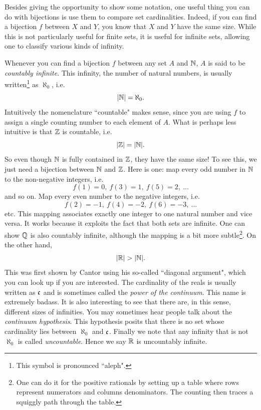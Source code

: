 Besides giving the opportunity to show some notation, one useful thing you can
do with bijections is use them to compare set cardinalities. Indeed, if you can
find a bijection $f$ between $X$ and $Y$, you know that $X$ and $Y$ have the
same size. While this is not particularly useful for finite sets, it is useful
for infinite sets, allowing one to classify various kinds of infinity.

\begin{example*}{}{}
Whenever you can find a bijection $f$ between any set $A$ and $\mathbb{N}$, $A$ is said to
be {\it countably infinite}. This infinity, the number
of natural numbers, is usually written\footnote{This symbol is pronounced
``aleph".} as $\aleph_0$, i.e.
$$|\mathbb{N}|=\aleph_0.$$
Intuitively the nomenclature ``countable" makes
sense, since you are using $f$ to assign a single counting number to each
element of $A$. What is perhaps less intuitive is that $\mathbb{Z}$ is countable, i.e.
$$|\mathbb{Z}|=|\mathbb{N}|.$$
So even though $\mathbb{N}$ is fully contained in $\mathbb{Z}$, they have the same size! To see
this, we just need a bijection between $\mathbb{N}$ and $\mathbb{Z}$. Here is one: map every odd
number in $\mathbb{N}$ to the non-negative integers, i.e.
$$ f(1)=0,~f(3)=1,~f(5)=2,~...$$
and so on. Map every even number to the negative integers, i.e.
$$ f(2)=-1,~f(4)=-2,~f(6)=-3,~...$$
etc. This mapping associates exactly one integer to one natural number and vice
versa. It works because it exploits the fact that both sets are infinite. One
can show $\mathbb{Q}$ is also countably infinite, although the mapping is a bit more
subtle\footnote{One can do it for the positive rationals 
by setting up a table where rows represent
numerators and columns denominators. The counting then traces a squiggly path
through the table.}. On the other hand,
$$|\R|>|\N|.$$
This was first shown by Cantor using his so-called ``diagonal argument", which
you can look up if you are interested. The cardinality of the reals is usually
written as $\frak{c}$ and is sometimes called
the {\it power of the continuum}. This name is extremely badass. It is also
interesting to see that there are, in this sense, different sizes of infinities.
You may sometimes hear people talk about the 
{\it continuum hypothesis}. This hypothesis posits that
there is no set whose cardinality lies between $\aleph_0$ and $\frak{c}$.
Finally we note that any infinity that is not $\aleph_0$ is called {\it
uncountable}. Hence we say $\mathbb{R}$ is uncountably infinite.
\end{example*}

